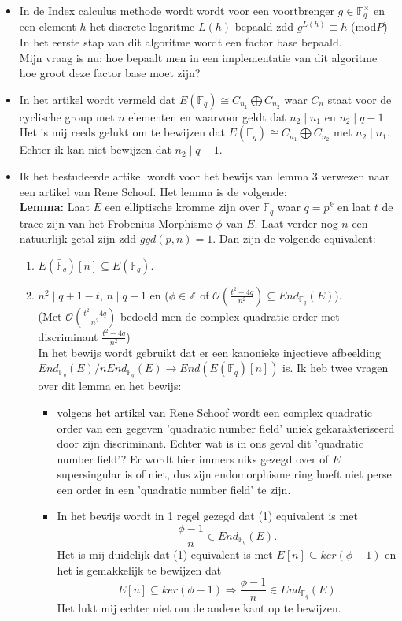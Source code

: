 \documentclass[10pt]{article}
\begin{document}
\begin{itemize}
\item In de Index calculus methode wordt wordt voor een voortbrenger $g \in \mathbb{F}_q^\times$ en een element $h$ het discrete logaritme $L(h)$ bepaald zdd $g^{L(h)}\equiv h$ (mod$P$)\\
In het eerste stap van dit algoritme wordt een factor base bepaald.\\
Mijn vraag is nu: hoe bepaalt men in een implementatie van dit algoritme hoe groot deze factor base moet zijn?
\item In het artikel wordt vermeld dat $E(\mathbb{F}_q) \cong C_{n_1} \bigoplus C_{n_2}$ waar $C_n$ staat voor de cyclische group met $n$ elementen en waarvoor geldt dat $n_2 \mid n_1$ en $n_2 \mid q-1$.\\
Het is mij reeds gelukt om te bewijzen dat $E(\mathbb{F}_q) \cong C_{n_1} \bigoplus C_{n_2}$ met $n_2 \mid n_1$. Echter ik kan niet bewijzen dat $n_2 \mid q-1$.
\item Ik het bestudeerde artikel wordt voor het bewijs van lemma 3 verwezen naar een artikel van Rene Schoof. Het lemma is de volgende:\\
{\bf Lemma:} Laat $E$ een elliptische kromme zijn over $\mathbb{F}_q$ waar $q=p^k$ en laat $t$ de trace zijn van het Frobenius Morphisme $\phi$ van $E$. Laat verder nog $n$ een natuurlijk getal zijn zdd $ggd(p,n)=1$. Dan zijn de volgende equivalent:
\begin{enumerate}
\item $E(\bar{\mathbb{F}}_q)[n] \subseteq E(\mathbb{F}_q)$.
\item $n^2\mid q+1-t$, $n \mid q-1$ en ($\phi \in \mathbb{Z}$ of $\mathcal{O}(\frac{t^2-4q}{n^2})\subseteq End_{\mathbb{F}_q}(E)$).\\
(Met $\mathcal{O}(\frac{t^2-4q}{n^2})$ bedoeld men de complex quadratic order met discriminant $\frac{t^2-4q}{n^2}$) \\
In het bewijs wordt gebruikt dat er een kanonieke injectieve afbeelding $ End_{\mathbb{F}_q}(E)/nEnd_{\mathbb{F}_q}(E) \rightarrow End(E(\bar{\mathbb{F}}_q)[n])$ is.
Ik heb twee vragen over dit lemma en het bewijs:
\begin{itemize}
\item volgens het artikel van Rene Schoof wordt een complex quadratic order van een gegeven 'quadratic number field'  uniek gekarakteriseerd door zijn discriminant. Echter wat is in ons geval dit 'quadratic number field'? Er wordt hier immers niks gezegd over of $E$ supersingular is of niet, dus zijn endomorphisme ring hoeft niet perse een order in een 'quadratic number field' te zijn.  
\item In het bewijs wordt in 1 regel gezegd dat (1) equivalent is met $$\frac{\phi -1}{n} \in End_{\mathbb{F}_q}(E).$$
Het is mij duidelijk dat (1) equivalent is met $E[n] \subseteq ker(\phi -1)$ en het is gemakkelijk te bewijzen dat $$E[n] \subseteq ker(\phi -1) \Rightarrow \frac{\phi -1}{n} \in End_{\mathbb{F}_q}(E)$$
Het lukt mij echter niet om de andere kant op te bewijzen.
\end{itemize}
\end{enumerate}
\end{itemize}
\end{document}
